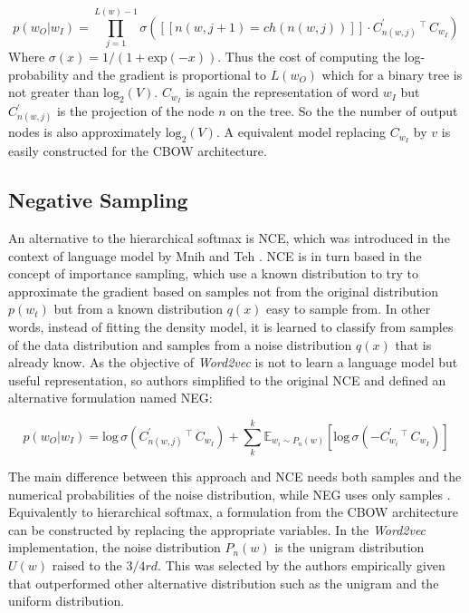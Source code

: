 \begin{equation}
   \label{eq:hierarchical-softmax-prob}
  p(w_O|w_I)  = \prod^{L(w)-1}_{j=1}\sigma\left( [\![n(w,j + 1) = ch(n(w,j))   ]\!] \cdot C^{'}_{n(w,j)}  \,^\top\, C_{w_I}   \right) 
\end{equation}
Where $\sigma(x) = 1/(1 + \text{exp}(-x)) $.  Thus the cost of computing the
log-probability and the gradient is proportional to $L(w_O)$ which for a
binary tree is not greater than $\text{log}_2(V)$.   $C_{w_{I}}$ is again the
representation  of word $w_{I}$  but   $  C^{'}_{n(w,j)}
$ is the projection of the node $n$ on the tree.  So the the number of output
nodes is also  approximately $\text{log}_2(V)$. A equivalent model replacing
$C_{w_I}$ by $v$ is easily constructed for the \ac{CBOW} architecture.

\subsection{Negative Sampling}

An alternative to the hierarchical softmax is \ac{NCE}, which was  introduced in the
context of language model by Mnih and Teh \cite{citeulike:4416856}. \ac{NCE}
is in turn based in the concept of importance sampling, which use a known
distribution to try to approximate the gradient based on samples not from the
original distribution $p(w_t) $ but from a known distribution $q(x)$ easy to
sample from.  In other words, instead of fitting the density model, it is
learned to classify from samples of the data distribution and samples from a
noise distribution $q(x)$ that is already know. 
As the objective of \textit{Word2vec} is not to learn a language model but
useful representation, so authors simplified  to the original \ac{NCE} and
defined an  alternative formulation named \ac{NEG}: 

\begin{equation}
  p(w_O|w_I)  =  \text{log}\,\sigma\left(C^{'}_{n(w,j)}  \,^\top\, C_{w_I}
  \right) + \sum^{k}_k\mathbb{E}_{w_{i}\sim P_{n}(w)}\left[
    \text{log}\,\sigma\left(-C^{'}_{w_i}  \,^\top\,  C_{w_I} \right)  \right]
\end{equation}

The main difference between this approach and \ac{NCE}  needs both
samples and the numerical probabilities of the noise distribution, while \ac{NEG} uses only
samples \cite{MikolovSCCD13}.  Equivalently to  hierarchical softmax, a formulation from  the \ac{CBOW}
 architecture can be constructed by replacing the appropriate variables.
In the \textit{Word2vec} implementation, the
noise distribution  $P_n(w)$ is the unigram distribution $U(w)$ raised to the
$3/4rd$. This was selected by the authors empirically given that outperformed
other alternative distribution such as the unigram and the uniform
distribution. 



